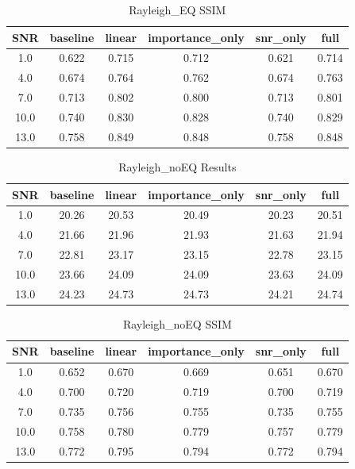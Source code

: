 \begin{table}[h]
\centering
\caption{Rayleigh_EQ SSIM}
\begin{tabular}{c|ccccc}
\hline
SNR & baseline & linear & importance_only & snr_only & full \\ \hline
1.0 & 0.622 & 0.715 & 0.712 & 0.621 & 0.714 \\
4.0 & 0.674 & 0.764 & 0.762 & 0.674 & 0.763 \\
7.0 & 0.713 & 0.802 & 0.800 & 0.713 & 0.801 \\
10.0 & 0.740 & 0.830 & 0.828 & 0.740 & 0.829 \\
13.0 & 0.758 & 0.849 & 0.848 & 0.758 & 0.848 \\
\hline
\end{tabular}
\end{table}
\begin{table}[h]
\centering
\caption{Rayleigh_noEQ Results}
\begin{tabular}{c|ccccc}
\hline
SNR & baseline & linear & importance_only & snr_only & full \\ \hline
1.0 & 20.26 & 20.53 & 20.49 & 20.23 & 20.51 \\
4.0 & 21.66 & 21.96 & 21.93 & 21.63 & 21.94 \\
7.0 & 22.81 & 23.17 & 23.15 & 22.78 & 23.15 \\
10.0 & 23.66 & 24.09 & 24.09 & 23.63 & 24.09 \\
13.0 & 24.23 & 24.73 & 24.73 & 24.21 & 24.74 \\
\hline
\end{tabular}
\end{table}

\begin{table}[h]
\centering
\caption{Rayleigh_noEQ SSIM}
\begin{tabular}{c|ccccc}
\hline
SNR & baseline & linear & importance_only & snr_only & full \\ \hline
1.0 & 0.652 & 0.670 & 0.669 & 0.651 & 0.670 \\
4.0 & 0.700 & 0.720 & 0.719 & 0.700 & 0.719 \\
7.0 & 0.735 & 0.756 & 0.755 & 0.735 & 0.755 \\
10.0 & 0.758 & 0.780 & 0.779 & 0.757 & 0.779 \\
13.0 & 0.772 & 0.795 & 0.794 & 0.772 & 0.794 \\
\hline
\end{tabular}
\end{table}
